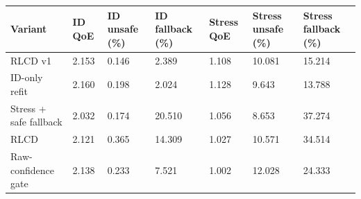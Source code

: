 \begin{tabular}{lllllll}
\toprule
Variant & ID QoE & ID unsafe (\%) & ID fallback (\%) & Stress QoE & Stress unsafe (\%) & Stress fallback (\%) \\
\midrule
RLCD v1 & 2.153 & 0.146 & 2.389 & 1.108 & 10.081 & 15.214 \\
ID-only refit & 2.160 & 0.198 & 2.024 & 1.128 & 9.643 & 13.788 \\
Stress + safe fallback & 2.032 & 0.174 & 20.510 & 1.056 & 8.653 & 37.274 \\
RLCD & 2.121 & 0.365 & 14.309 & 1.027 & 10.571 & 34.514 \\
Raw-confidence gate & 2.138 & 0.233 & 7.521 & 1.002 & 12.028 & 24.333 \\
\bottomrule
\end{tabular}
